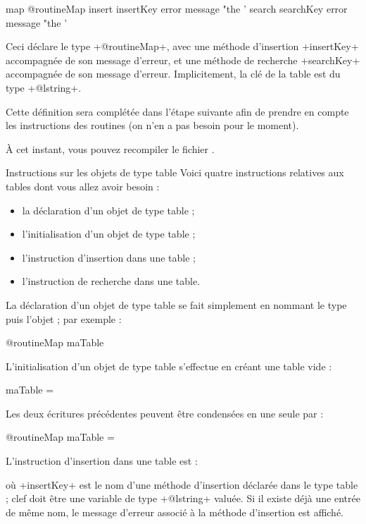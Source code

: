 \begin{galgas}
map @routineMap {
  insert insertKey error message "the '%
  search searchKey error message "the '%
}
\end{galgas}

Ceci déclare le type \ggs+@routineMap+, avec une méthode d'insertion \ggs+insertKey+ accompagnée de son message d'erreur, et une méthode de recherche \ggs+searchKey+ accompagnée de son message d'erreur. Implicitement, la clé de la table est du type \ggs+@lstring+.

Cette définition sera complétée dans l'étape suivante afin de prendre en compte les instructions des routines (on n'en a pas besoin pour le moment).

À cet instant, vous pouvez recompiler le fichier .

Instructions sur les objets de type table
Voici quatre instructions relatives aux tables dont vous allez avoir besoin :
\begin{itemize}
  \item la déclaration d'un objet de type table ;
  \item l'initialisation d'un objet de type table ;
  \item l'instruction d'insertion dans une table ;
  \item l'instruction de recherche dans une table.
\end{itemize}

La déclaration d'un objet de type table se fait simplement en nommant le type puis l'objet ; par exemple :
\begin{galgas}
@routineMap maTable
\end{galgas}

L'initialisation d'un objet de type table s'effectue en créant une table vide :
\begin{galgas}
maTable = {}
\end{galgas}

Les deux écritures précédentes peuvent être condensées en une seule par :
\begin{galgas}
@routineMap maTable = {}
\end{galgas}

L'instruction d'insertion dans une table est :
\begin{galgas}
\end{galgas}
où \ggs+insertKey+ est le nom d'une méthode d'insertion déclarée dans le type table ; clef doit être une variable de type \ggs+@lstring+ valuée. Si il existe déjà une entrée de même nom, le message d'erreur associé à la méthode d'insertion est affiché.

